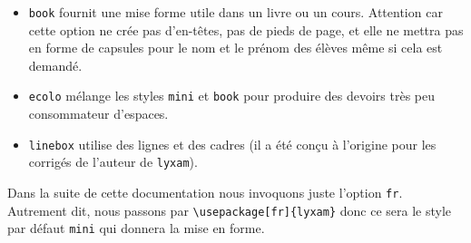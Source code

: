 \documentclass[12pt,a4paper]{scrartcl}
\begin{document}
\begin{itemize}
\begin{itemize}[label={\small\textbullet}]
        \item \verb+book+ fournit une mise forme utile dans un livre ou un cours. Attention car cette option ne crée pas d'en-têtes, pas de pieds de page, et elle ne mettra pas en forme de capsules pour le nom et le prénom des élèves même si cela est demandé.
        
        \item \verb+ecolo+ mélange les styles \verb+mini+ et \verb+book+ pour produire des devoirs très peu consommateur d'espaces.
        
        \item \verb+linebox+ utilise des lignes et des cadres (il a été conçu à l'origine pour les corrigés de l'auteur de \verb+lyxam+).

\end{itemize}
\end{itemize}


\begin{remark}
	Dans la suite de cette documentation nous invoquons juste l'option \verb+fr+.
	Autrement dit, nous passons par \verb+\usepackage[fr]{lyxam}+ donc ce sera le style par défaut \verb+mini+ qui donnera la mise en forme.
\end{remark}
\end{document}
